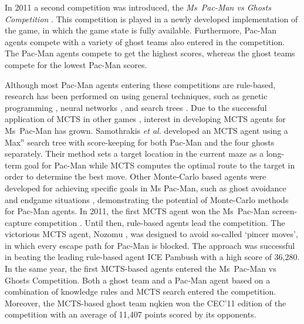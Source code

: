 \documentclass[journal]{IEEEtran}
\begin{document}
In 2011 a second competition was introduced, the \emph{Ms~Pac-Man vs Ghosts Competition} \cite{mspacmanvsghost}. This competition is played in a newly developed implementation of the game, in which the game state is fully available. Furthermore, Pac-Man agents compete with a variety of ghost teams also entered in the competition. The Pac-Man agents compete to get the highest scores, whereas the ghost teams compete for the lowest Pac-Man scores.

Although most Pac-Man agents entering these competitions are rule-based, research has been performed on using general techniques, such as genetic programming \cite{alhejali2010evolving}, neural networks \cite{lucas2005evolving}, and search trees \cite{robles2009simple}. Due to the successful application of MCTS in other games \cite{brownesurvey}, interest in developing MCTS agents for Ms~Pac-Man has grown. Samothrakis \emph{et al.} \cite{samothrakis2011fast} developed an MCTS agent using a Max$^{n}$ search tree with score-keeping for both Pac-Man and the four ghosts separately. Their method sets a target location in the current maze as a long-term goal for Pac-Man while MCTS computes the optimal route to the target in order to determine the best move. Other Monte-Carlo based agents were developed for achieving specific goals in Ms Pac-Man, such as ghost avoidance \cite{tong2010monteghost} and endgame situations \cite{tong2011monteendgame}, demonstrating the potential of Monte-Carlo methods for Pac-Man agents. 
In 2011, the first MCTS agent won the Ms~Pac-Man screen-capture competition \cite{mspacmanscreencap}. Until then, rule-based agents lead the competition. The victorious MCTS agent, {\sc Nozomu} \cite{ikehata2011monte}, was designed to avoid so-called `pincer moves', in which every escape path for Pac-Man is blocked. The approach was successful in beating the leading rule-based agent {\sc ICE Pambush} \cite{thawonmas2010evolution} with a high score of 36,280. In the same year, the first MCTS-based agents entered the Ms~Pac-Man vs Ghosts Competition. Both a ghost team \cite{iceguct, iceguctcig11} and a Pac-Man agent \cite{icepambushcig11} based on a combination of knowledge rules and MCTS search entered the competition. Moreover, the MCTS-based ghost team {\sc nqkien} \cite{iceguct, nguyen2011applying, nguyenmonte} won the CEC'11 \cite{cec11rankings} edition of the competition with an average of 11,407 points scored by its opponents. 
\end{document}
